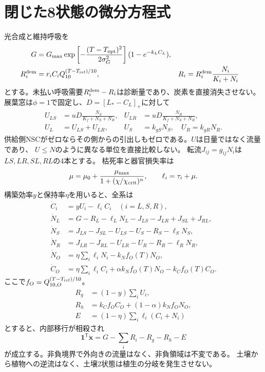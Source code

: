 \documentclass[a4paper,11pt]{ltjsarticle}
\begin{document}
\section{閉じた8状態の微分方程式}
光合成と維持呼吸を
\begin{align}
G&=G_{\max}\exp\left[-\frac{(T-T_{\rm opt})^2}{2\sigma_G^2}\right]
       (1-e^{-k_L C_L}),\\
R_i^{\rm dem}&=r_iC_i Q_{10}^{(T-T_{\rm ref})/10},&
R_i&=R_i^{\rm dem}\frac{N_i}{K_i+N_i}
\end{align}
とする。未払い呼吸需要$R_i^{\rm dem}-R_i$は診断量であり、炭素を直接消失させない。
展葉窓は$\phi=1$で固定し、$D=[L_*-C_L]_+$に対して
\begin{align}
U_{LS}&=uD\frac{N_S}{K_f+N_S+N_R},&
U_{LR}&=uD\frac{N_R}{K_f+N_S+N_R},\\
U_L&=U_{LS}+U_{LR},& U_S&=k_{gS}N_S,\quad U_R=k_{gR}N_R.
\end{align}
供給側NSCがゼロならその側からの引出しもゼロである。$U$は日量ではなく流量であり、
$U\leq N$のように異なる単位を直接比較しない。
転流$J_{ij}=g_{ij}N_i$は$LS,LR,SL,RL$の4本とする。
枯死率と器官損失率は
\begin{equation}
\mu=\mu_0+\frac{\mu_{\max}}{1+(\chi/\chi_{\rm crit})^n},\qquad
\ell_i=\tau_i+\mu.
\end{equation}
構築効率$y$と保持率$\eta$を用いると、全系は
\begin{align}
\dot C_i&=yU_i-\ell_i C_i \quad(i=L,S,R),\\
\dot N_L&=G-R_L-\ell_LN_L-J_{LS}-J_{LR}+J_{SL}+J_{RL},\\
\dot N_S&=J_{LS}-J_{SL}-U_{LS}-U_S-R_S-\ell_SN_S,\\
\dot N_R&=J_{LR}-J_{RL}-U_{LR}-U_R-R_R-\ell_RN_R,\\
\dot N_O&=\eta\sum_i\ell_i N_i-k_N f_O(T)N_O,\\
\dot C_O&=\eta\sum_i\ell_i C_i+\alpha k_N f_O(T)N_O-k_C f_O(T)C_O.
\end{align}
ここで$f_O=Q_{10,O}^{(T-T_{\rm ref})/10}$。
\begin{align}
R_g&=(1-y)\sum_iU_i,\\
R_h&=k_C f_O C_O+(1-\alpha)k_N f_O N_O,\\
E&=(1-\eta)\sum_i\ell_i(C_i+N_i)
\end{align}
とすると、内部移行が相殺され
\begin{equation}
\boldsymbol1^\mathsf{T}\dot{\boldsymbol x}=G-\sum_iR_i-R_g-R_h-E
\end{equation}
が成立する。非負境界で外向きの流量はなく、非負領域は不変である。
土壌から植物への逆流はなく、土壌2状態は植生の分岐を発生させない。
\end{document}
